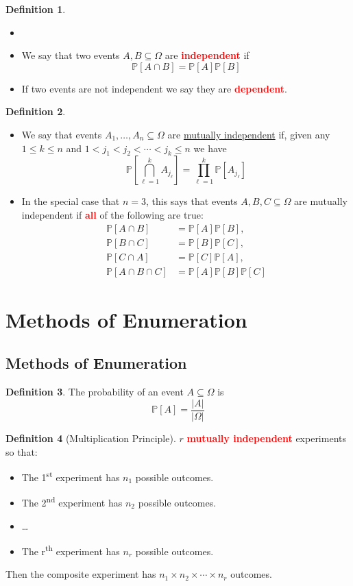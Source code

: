 \documentclass{article}
\newcommand{\PP}{\mathbb{P}}
\newcommand{\bfred}[1]{\textcolor{red}{\textbf{#1}}}
\theoremstyle{plain}
\theoremstyle{definition}
\newtheorem{defn}{Definition}[section]
\theoremstyle{remark}
\begin{document}
\begin{defn}
    \begin{itemize}
        \item[]
        \item We say that two events $A, B \subseteq \Omega$ are \bfred{independent} if \[\PP[A \cap B] = \PP[A]\PP[B]\]
        \item If two events are not independent we say they are \bfred{dependent}.
    \end{itemize}
\end{defn}

\begin{defn}
    \begin{itemize}
        \item We say that events $A_1, \dotsc, A_n \subseteq \Omega$ are \underline{mutually independent} if, given any $1 \leq k \leq n$ and $1 < j_1 < j_2 < \dotsb < j_k \leq n$ we have \[\PP\left[\bigcap_{\ell = 1}^kA_{j_\ell}\right] = \prod_{\ell = 1}^k\PP[A_{j_\ell}]\]
        \item In the special case that $n = 3$, this says that events $A, B, C \subseteq \Omega$ are mutually independent if \bfred{all} of the following are true: \begin{align*}
            \PP[A \cap B] &= \PP[A]\PP[B], \\
            \PP[B \cap C] &= \PP[B]\PP[C], \\
            \PP[C \cap A] &= \PP[C]\PP[A], \\
            \PP[A \cap B \cap C] &= \PP[A]\PP[B]\PP[C]
        \end{align*}
    \end{itemize}
\end{defn}

\section{Methods of Enumeration}
\subsection{Methods of Enumeration}

\begin{defn}
    The probability of an event $A \subseteq \Omega$ is \[\PP[A] = \frac{\vert A \vert}{\vert \Omega \vert}\]
\end{defn}

\begin{defn}[Multiplication Principle]
    $r$ \bfred{mutually independent} experiments so that:
    \begin{itemize}
        \item The 1\textsuperscript{st} experiment has $n_1$ possible outcomes.
        \item The 2\textsuperscript{nd} experiment has $n_2$ possible outcomes.
        \item \ldots
        \item The r\textsuperscript{th} experiment has $n_r$ possible outcomes.
    \end{itemize}
    Then the composite experiment has $n_1 \times n_2 \times \dotsm \times n_r$ outcomes.
\end{defn}
\end{document}
